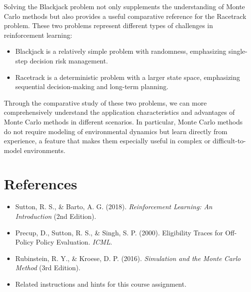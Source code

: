 \documentclass{article}
\begin{document}
Solving the Blackjack problem not only supplements the understanding of Monte Carlo methods but also provides a useful comparative reference for the Racetrack problem. These two problems represent different types of challenges in reinforcement learning:

\begin{itemize}
    \item Blackjack is a relatively simple problem with randomness, emphasizing single-step decision risk management.
    \item Racetrack is a deterministic problem with a larger state space, emphasizing sequential decision-making and long-term planning.
\end{itemize}

Through the comparative study of these two problems, we can more comprehensively understand the application characteristics and advantages of Monte Carlo methods in different scenarios. In particular, Monte Carlo methods do not require modeling of environmental dynamics but learn directly from experience, a feature that makes them especially useful in complex or difficult-to-model environments.


\section{References}
\begin{itemize}
    \item Sutton, R. S., \& Barto, A. G. (2018). \emph{Reinforcement Learning: An Introduction} (2nd Edition).
    \item Precup, D., Sutton, R. S., \& Singh, S. P. (2000). Eligibility Traces for Off-Policy Policy Evaluation. \emph{ICML}.
    \item Rubinstein, R. Y., \& Kroese, D. P. (2016). \emph{Simulation and the Monte Carlo Method} (3rd Edition).
    \item Related instructions and hints for this course assignment.
\end{itemize}
\end{document}
